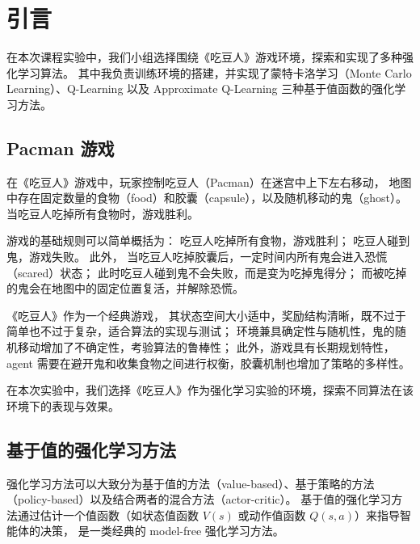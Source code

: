 \section{引言}

在本次课程实验中，我们小组选择围绕《吃豆人》游戏环境，探索和实现了多种强化学习算法。
其中我负责训练环境的搭建，并实现了蒙特卡洛学习（Monte Carlo Learning）、Q-Learning 以及 Approximate Q-Learning 三种基于值函数的强化学习方法。

\subsection{Pacman 游戏}
在《吃豆人》游戏中，玩家控制吃豆人（Pacman）在迷宫中上下左右移动，
地图中存在固定数量的食物（food）和胶囊（capsule），以及随机移动的鬼（ghost）。
当吃豆人吃掉所有食物时，游戏胜利。

游戏的基础规则可以简单概括为：
吃豆人吃掉所有食物，游戏胜利；
吃豆人碰到鬼，游戏失败。
此外，
当吃豆人吃掉胶囊后，一定时间内所有鬼会进入恐慌（scared）状态；
此时吃豆人碰到鬼不会失败，而是变为吃掉鬼得分；
而被吃掉的鬼会在地图中的固定位置复活，并解除恐慌。


《吃豆人》作为一个经典游戏，%
其状态空间大小适中，奖励结构清晰，既不过于简单也不过于复杂，适合算法的实现与测试；
环境兼具确定性与随机性，鬼的随机移动增加了不确定性，考验算法的鲁棒性；
此外，游戏具有长期规划特性，agent 需要在避开鬼和收集食物之间进行权衡，胶囊机制也增加了策略的多样性。

在本次实验中，我们选择《吃豆人》作为强化学习实验的环境，探索不同算法在该环境下的表现与效果。


\subsection{基于值的强化学习方法}

强化学习方法可以大致分为基于值的方法（value-based）、基于策略的方法（policy-based）以及结合两者的混合方法（actor-critic）。
基于值的强化学习方法通过估计一个值函数（如状态值函数 $V(s)$ 或动作值函数 $Q(s,a)$）来指导智能体的决策，
是一类经典的 model-free 强化学习方法。

